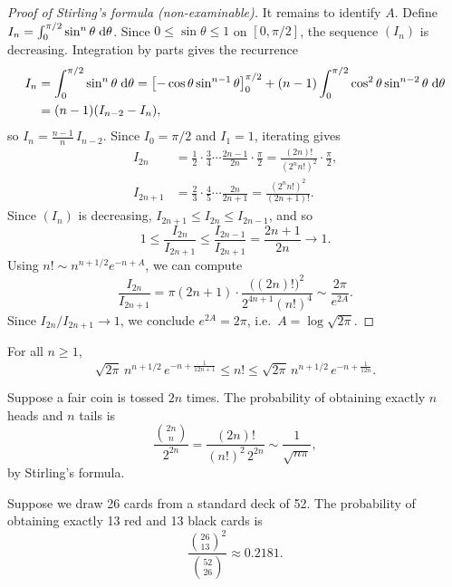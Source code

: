 \documentclass[a4paper]{article}
\begin{document}
\begin{proof}[Proof of Stirling's formula (non-examinable)]
  It remains to identify $A$. Define $I_n = \int_0^{\pi/2} \sin^n\theta\;\mathrm{d} \theta$. Since $0 \leq \sin\theta \leq 1$ on $[0, \pi/2]$, the sequence $(I_n)$ is decreasing. Integration by parts gives the recurrence
  \begin{align*}
    I_n &= \int_0^{\pi/2}\sin^n \theta\;\mathrm{d} \theta = \left[-\cos\theta\sin^{n - 1}\theta \right]_0^{\pi/2} + (n - 1)\int_0^{\pi/2}\cos^2\theta \sin^{n - 2}\theta \;\mathrm{d}\theta\\
    &= (n - 1)(I_{n - 2} - I_n),
  \end{align*}
  so $I_n = \frac{n - 1}{n}\,I_{n - 2}$. Since $I_0 = \pi/2$ and $I_1 = 1$, iterating gives
  \begin{align*}
    I_{2n} &= \frac{1}{2}\cdot\frac{3}{4}\cdots \frac{2n - 1}{2n}\cdot \frac{\pi}{2} = \frac{(2n)!}{(2^n n!)^2}\cdot\frac{\pi}{2},\\
    I_{2n + 1} &= \frac{2}{3}\cdot\frac{4}{5}\cdots\frac{2n}{2n + 1} = \frac{(2^n n!)^2}{(2n + 1)!}.
  \end{align*}
  Since $(I_n)$ is decreasing, $I_{2n+1} \leq I_{2n} \leq I_{2n-1}$, and so
  \[
    1 \leq \frac{I_{2n}}{I_{2n + 1}} \leq \frac{I_{2n - 1}}{I_{2n + 1}} = \frac{2n+1}{2n} \to 1.
  \]
  Using $n!\sim n^{n + 1/2}e^{-n + A}$, we can compute
  \[
    \frac{I_{2n}}{I_{2n + 1}} = \pi(2n + 1)\cdot\frac{\bigl((2n)!\bigr)^2}{2^{4n + 1}(n!)^4} \sim \frac{2\pi}{e^{2A}}.
  \]
  Since $I_{2n}/I_{2n+1} \to 1$, we conclude $e^{2A} = 2\pi$, i.e.\ $A = \log\sqrt{2\pi}$.
\end{proof}

\begin{prop}
  For all $n \geq 1$,
  \[
    \sqrt{2\pi}\, n^{n + 1/2}\, e^{-n + \frac{1}{12n + 1}} \leq n! \leq \sqrt{2\pi}\, n^{n + 1/2}\, e^{-n + \frac{1}{12n}}.
  \]
\end{prop}

\begin{eg}
  Suppose a fair coin is tossed $2n$ times. The probability of obtaining exactly $n$ heads and $n$ tails is
  \[
    \frac{\binom{2n}{n}}{2^{2n}} = \frac{(2n)!}{(n!)^2\, 2^{2n}} \sim \frac{1}{\sqrt{n\pi}},
  \]
  by Stirling's formula.
\end{eg}

\begin{eg}
  Suppose we draw 26 cards from a standard deck of 52. The probability of obtaining exactly 13 red and 13 black cards is
  \[
    \frac{\binom{26}{13}^2}{\binom{52}{26}} \approx 0.2181.
  \]
\end{eg}
\end{document}

